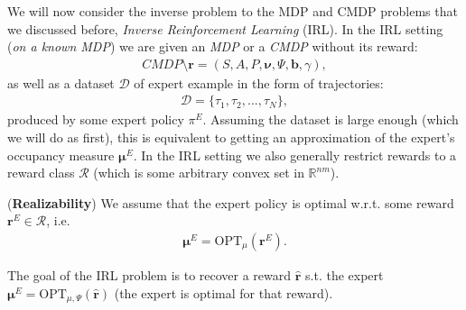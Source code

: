 We will now consider the inverse problem to the MDP and CMDP problems that we discussed before, \textit{Inverse Reinforcement Learning} (IRL). In the IRL setting (\textit{on a known MDP}) we are given an \textit{MDP} or a \textit{CMDP} without its reward:
\begin{align*}
    \textit{CMDP} \setminus \bm{r} = (S,A,P,\bm{\nu},\Psi,\bm{b},\gamma),
\end{align*}
as well as a dataset $\mathcal{D}$ of expert example in the form of trajectories:
\begin{align*}
    \mathcal{D} = \{  \tau_1,\tau_2,...,\tau_N\},
\end{align*}
produced by some expert policy $\pi^E$. Assuming the dataset is large enough (which we will do as first), this is equivalent to getting an approximation of the expert's occupancy measure $\bm{\mu}^E$. In the IRL setting we also generally restrict rewards to a reward class $\mathcal{R}$ (which is some arbitrary convex set in $\mathbb{R}^{nm}$).
\begin{assumption}
    \label{assumption:realizability}
    (\textbf{Realizability})
    We assume that the expert policy is optimal w.r.t. some reward $\bm{r}^E \in \mathcal{R}$, i.e. 
    \begin{align*}
        \bm{\mu}^E = \text{OPT}_{\mu}(\bm{r}^E).
    \end{align*}
\end{assumption}
\noindent
The goal of the IRL problem is to recover a reward $\hat{\bm{r}}$ s.t. the expert $\bm{\mu}^E = \text{OPT}_{\mu,\Psi}(\hat{\bm{r}})$ (the expert is optimal for that reward).

